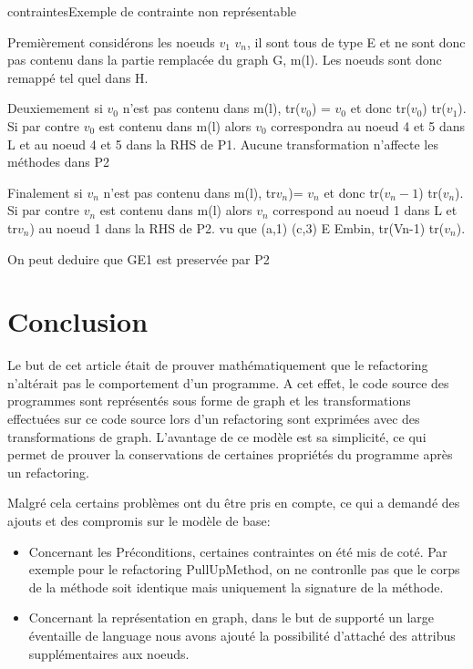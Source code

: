 \documentclass[a4paper, 12pt]{article}
\begin{document}
\begin{figu}{contraintes}{Exemple de contrainte non représentable}
{\begin{enumerate}
Premièrement considérons les noeuds  {$v_1$} {\rightarrow} {$v_n$}, il sont  tous de type E et ne sont donc pas contenu dans la partie remplacée du graph G, m(l).
Les noeuds sont donc remappé tel quel dans H.

Deuxiemement si {$v_0$} n'est pas contenu dans m(l), tr({$v_0$}) = {$v_0$} et donc tr({$v_0$})  tr({$v_1$}).
Si par contre {$v_0$} est contenu dans m(l) alors {$v_0$} correspondra au noeud 4 et 5 dans L et au noeud 4 et 5 dans la RHS de P1. Aucune transformation n'affecte les méthodes dans P2

Finalement si {$v_n$} n'est pas contenu dans m(l), tr{$v_n$})= {$v_n$} et donc tr({$v_n-1$})  tr({$v_n$}).
Si par contre {$v_n$} est contenu dans m(l) alors {$v_n$} correspond au noeud 1 dans L et tr{$v_n$}) au noeud 1 dans la RHS de P2. vu que (a,1) {\rightarrow} (c,3) E Embin, tr(Vn-1)  tr({$v_n$}).

On peut deduire que GE1 est preservée par P2
\end{enumerate}

\section{Conclusion}

Le but de cet article était de prouver mathématiquement que le refactoring n'altérait pas le comportement d'un programme. A cet effet, le code source des programmes sont représentés sous forme de graph
et les transformations effectuées sur ce code source lors d'un refactoring sont exprimées avec des transformations de graph.
L'avantage de ce modèle est sa simplicité, ce qui permet de prouver la conservations de certaines propriétés du programme après un refactoring.

Malgré cela certains problèmes ont du être pris en compte, ce qui a demandé des ajouts et des compromis sur le modèle de base:

\begin{itemize}
\item Concernant les Préconditions, certaines contraintes on été mis de coté. Par exemple pour le refactoring PullUpMethod, on ne contronlle pas que le corps de la méthode soit identique mais uniquement la signature de la méthode.

\item Concernant la représentation en graph, dans le but de supporté un large éventaille de language nous avons ajouté la possibilité d'attaché des attribus supplémentaires aux noeuds.


\end{itemize}}
\end{figu}
\end{document}
